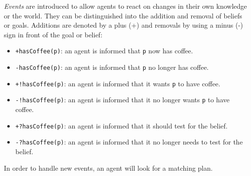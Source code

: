 \emph{Events} are introduced to allow agents to react on changes in their own knowledge or the world.
They can be distinguished into the addition and removal of beliefs or goals.
Additions are denoted by a plus (+) and removals by using a minus (-) sign in front of the goal or belief:
\begin{itemize}
  \item \texttt{+hasCoffee(p)}: an agent is informed that \texttt{p} now has coffee.
  \item \texttt{-hasCoffee(p)}: an agent is informed that \texttt{p} no longer has coffee.
  \item \texttt{+!hasCoffee(p)}: an agent is informed that it wants \texttt{p} to have coffee.
  \item \texttt{-!hasCoffee(p)}: an agent is informed that it no longer wants \texttt{p} to have coffee.
  \item \texttt{+?hasCoffee(p)}: an agent is informed that it should test for the belief.
  \item \texttt{-?hasCoffee(p)}: an agent is informed that it no longer needs to test for the belief.
\end{itemize}
In order to handle new events, an agent will look for a matching plan.

